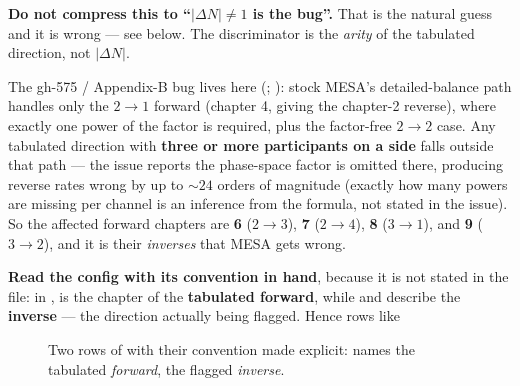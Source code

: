 \begin{warn}
\textbf{Do not compress this to ``$|\Delta N| \neq 1$ is the bug''.} That is the
natural guess and it is wrong --- see below. The discriminator is the
\emph{arity} of the tabulated direction, not $|\Delta N|$.
\end{warn}

The gh-575 / Appendix-B bug lives here (\citealp{mesa575}; \citealt[App.~B]{grichener2025}): stock MESA's detailed-balance path handles only the
\textbf{$2 \to 1$} forward (chapter 4, giving the chapter-2 reverse), where
exactly one power of the factor is required, plus the factor-free $2 \to 2$
case. Any tabulated direction with \textbf{three or more participants on a
side} falls outside that path --- the issue reports the phase-space factor is
omitted there, producing reverse rates wrong by up to ${\sim}24$ orders of
magnitude (exactly how many powers are missing per channel is an inference from
the formula, not stated in the issue). So the affected forward chapters are
\textbf{6} ($2\to3$), \textbf{7} ($2\to4$), \textbf{8} ($3\to1$), and
\textbf{9} ($3\to2$), and it is their \emph{inverses} that MESA gets wrong.

\textbf{Read the config with its convention in hand}, because it is not stated
in the file: in ,
 is the chapter of the \textbf{tabulated forward}, while
 and  describe the \textbf{inverse} --- the
direction actually being flagged. Hence rows like

\begin{figure}[H]
\centering
{}
\caption{Two rows of  with
their convention made explicit:  names the tabulated
\emph{forward},  the flagged \emph{inverse}.}
\label{fig:appendixb}
\end{figure}

